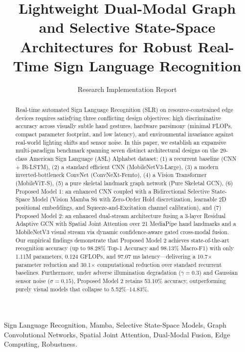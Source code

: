 \documentclass[journal]{IEEEtran}
\begin{document}
\title{Lightweight Dual-Modal Graph and Selective State-Space Architectures for Robust Real-Time Sign Language Recognition}

\author{Research Implementation Report}

\maketitle

\begin{abstract}
Real-time automated Sign Language Recognition (SLR) on resource-constrained edge devices requires satisfying three conflicting design objectives: high discriminative accuracy across visually subtle hand gestures, hardware parsimony (minimal FLOPs, compact parameter footprint, and low latency), and environmental invariance against real-world lighting shifts and sensor noise. In this paper, we establish an expansive multi-paradigm benchmark spanning seven distinct architectural designs on the 29-class American Sign Language (ASL) Alphabet dataset: (1) a recurrent baseline (CNN + Bi-LSTM), (2) a standard efficient CNN (MobileNetV3-Large), (3) a modern inverted-bottleneck ConvNet (ConvNeXt-Femto), (4) a Vision Transformer (MobileViT-S), (5) a pure skeletal landmark graph network (Pure Skeletal GCN), (6) Proposed Model 1: an enhanced CNN coupled with a Bidirectional Selective State-Space Model (Vision Mamba S6 with Zero-Order Hold discretization, learnable 2D positional embeddings, and Squeeze-and-Excitation channel calibration), and (7) Proposed Model 2: an enhanced dual-stream architecture fusing a 3-layer Residual Adaptive GCN with Spatial Joint Attention over 21 MediaPipe hand landmarks and a MobileNetV3 visual stream via dynamic confidence-aware gated cross-modal fusion. Our empirical findings demonstrate that Proposed Model 2 achieves state-of-the-art recognition accuracy (up to 98.28\% Top-1 Accuracy and 98.13\% Macro-F1) with only 1.11M parameters, 0.124 GFLOPs, and 97.07 ms latency---delivering a 10.7$\times$ parameter reduction and 30.1$\times$ computational reduction over standard recurrent baselines. Furthermore, under adverse illumination degradation ($\gamma = 0.3$) and Gaussian sensor noise ($\sigma = 0.15$), Proposed Model 2 retains 53.10\% accuracy, outperforming purely visual models that collapse to 5.52\%--14.83\%.
\end{abstract}

\begin{IEEEkeywords}
Sign Language Recognition, Mamba, Selective State-Space Models, Graph Convolutional Networks, Spatial Joint Attention, Dual-Modal Fusion, Edge Computing, Robustness.
\end{IEEEkeywords}
\end{document}
